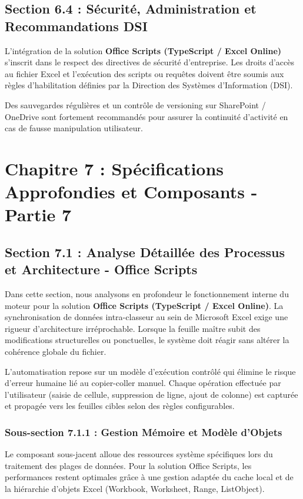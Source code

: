 \documentclass[12pt,a4paper]{report}
\begin{document}
\section{Section 6.4 : Sécurité, Administration et Recommandations DSI}
L'intégration de la solution \textbf{Office Scripts (TypeScript / Excel Online)} s'inscrit dans le respect des directives de sécurité d'entreprise. Les droits d'accès au fichier Excel et l'exécution des scripts ou requêtes doivent être soumis aux règles d'habilitation définies par la Direction des Systèmes d'Information (DSI).

Des sauvegardes régulières et un contrôle de versioning sur SharePoint / OneDrive sont fortement recommandés pour assurer la continuité d'activité en cas de fausse manipulation utilisateur.


\chapter{Chapitre 7 : Spécifications Approfondies et Composants - Partie 7}

\section{Section 7.1 : Analyse Détaillée des Processus et Architecture - Office Scripts}
Dans cette section, nous analysons en profondeur le fonctionnement interne du moteur pour la solution \textbf{Office Scripts (TypeScript / Excel Online)}. La synchronisation de données intra-classeur au sein de Microsoft Excel exige une rigueur d'architecture irréprochable. Lorsque la feuille maître subit des modifications structurelles ou ponctuelles, le système doit réagir sans altérer la cohérence globale du fichier.

L'automatisation repose sur un modèle d'exécution contrôlé qui élimine le risque d'erreur humaine lié au copier-coller manuel. Chaque opération effectuée par l'utilisateur (saisie de cellule, suppression de ligne, ajout de colonne) est capturée et propagée vers les feuilles cibles selon des règles configurables.


\subsection{Sous-section 7.1.1 : Gestion Mémoire et Modèle d'Objets}
Le composant sous-jacent alloue des ressources système spécifiques lors du traitement des plages de données. Pour la solution Office Scripts, les performances restent optimales grâce à une gestion adaptée du cache local et de la hiérarchie d'objets Excel (Workbook, Worksheet, Range, ListObject).
\end{document}

